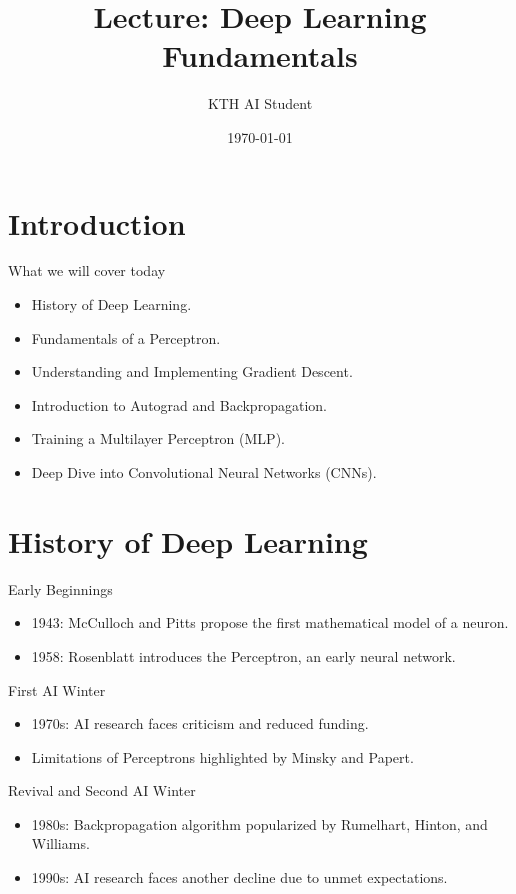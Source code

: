 \documentclass{beamer}
\title{Lecture: Deep Learning Fundamentals}
\author{KTH AI Student}
\date{\today}
\begin{document}
\frame{\titlepage}

\section{Introduction}
\begin{frame}{What we will cover today}
    \begin{itemize}
        \item History of Deep Learning.
        \item Fundamentals of a Perceptron.
        \item Understanding and Implementing Gradient Descent.
        \item Introduction to Autograd and Backpropagation.
        \item Training a Multilayer Perceptron (MLP).
        \item Deep Dive into Convolutional Neural Networks (CNNs).
    \end{itemize}
\end{frame}

\section{History of Deep Learning}
\begin{frame}{Early Beginnings}
    \begin{itemize}
        \item 1943: McCulloch and Pitts propose the first mathematical model of a neuron.
        \item 1958: Rosenblatt introduces the Perceptron, an early neural network.
    \end{itemize}
\end{frame}

\begin{frame}{First AI Winter}
    \begin{itemize}
        \item 1970s: AI research faces criticism and reduced funding.
        \item Limitations of Perceptrons highlighted by Minsky and Papert.
    \end{itemize}
\end{frame}

\begin{frame}{Revival and Second AI Winter}
    \begin{itemize}
        \item 1980s: Backpropagation algorithm popularized by Rumelhart, Hinton, and Williams.
        \item 1990s: AI research faces another decline due to unmet expectations.
    \end{itemize}
\end{frame}
\end{document}
